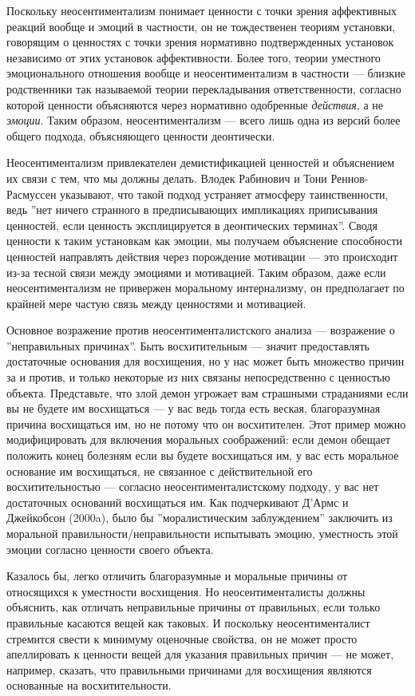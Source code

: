 \documentclass[11pt]{book}
\begin{document}
Поскольку неосентиментализм понимает ценности с точки зрения аффективных реакций вообще и эмоций в частности, он не тождественен теориям установки, говорящим о ценностях с точки зрения нормативно подтвержденных установок независимо от этих установок аффективности. Более того, теории уместного эмоционального отношения вообще и неосентиментализм в частности --- близкие родственники так называемой теории перекладывания ответственности, согласно которой ценности объясняются через нормативно одобренные \textit{действия}, а не \textit{эмоции}. Таким образом, неосентиментализм --- всего лишь одна из версий более общего подхода, объясняющего ценности деонтически.

Неосентиментализм привлекателен демистификацией ценностей и объяснением их связи с тем, что мы должны делать. Влодек Рабинович и Тони Реннов-Расмуссен указывают, что такой подход устраняет атмосферу таинственности, ведь ''нет ничего странного в предписывающих импликациях приписывания ценностей, если ценность эксплицируется в деонтических терминах''. Сводя ценности к таким установкам как эмоции, мы получаем объяснение способности ценностей направлять действия через порождение мотивации --- это происходит из-за тесной связи между эмоциями и мотивацией. Таким образом, даже если неосентиментализм не привержен моральному интернализму, он предполагает по крайней мере частую связь между ценностями и мотивацией.

Основное возражение против неосентименталистского анализа --- возражение о ''неправильных причинах''. Быть восхитительным --- значит предоставлять достаточные основания для восхищения, но у нас может быть множество причин за и против, и только некоторые из них связаны непосредственно с ценностью объекта. Представьте, что злой демон угрожает вам страшными страданиями если вы не будете им восхищаться --- у вас ведь тогда есть веская, благоразумная причина восхищаться им, но не потому что он восхитителен. Этот пример можно модифицировать для включения моральных соображений: если демон обещает положить конец болезням если вы будете восхищаться им, у вас есть моральное основание им восхищаться, не связанное с действительной его восхитительностью --- согласно неосентименталистскому подходу, у вас нет достаточных оснований восхищаться им. Как подчеркивают Д'Армс и Джейкобсон (2000a), было бы ''моралистическим заблуждением'' заключить из моральной правильности/неправильности испытывать эмоцию, уместность этой эмоции согласно ценности своего объекта.

Казалось бы, легко отличить благоразумные и моральные причины от относящихся к уместности восхищения. Но неосентименталисты должны объяснить, как отличать неправильные причины от правильных, если только правильные касаются вещей как таковых. И поскольку неосентименталист стремится свести к минимуму оценочные свойства, он не может просто апеллировать к ценности вещей для указания правильных причин --- не может, например, сказать, что правильными причинами для восхищения являются основанные на восхитительности.
\end{document}
